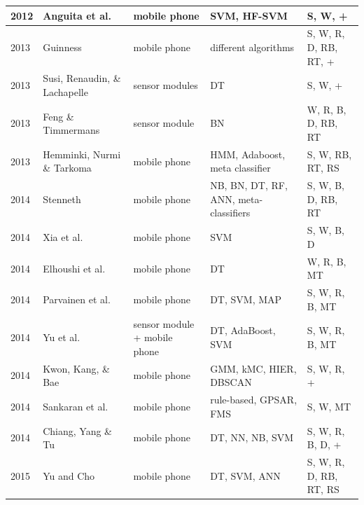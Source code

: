 \begin{center}
\begin{longtable} {|l|>{\raggedright}p{3cm}|p{2.4cm}|>{\centering\arraybackslash}p{2.5cm}|>{\centering\arraybackslash}p{2.2cm}|}
2012 & Anguita et al. \cite{anguita2012human} & mobile phone & SVM, HF-SVM & S, W, + \\ \hline
2013 & Guinness \cite{Guinness2013}& mobile phone & 20 different algorithms & S, W, R, D, RB, RT, +\\ \hline
2013 & Susi, Renaudin, \& Lachapelle \cite{susi2013motion}& sensor modules & DT & S, W, + \\ \hline
2013 & Feng \& Timmermans \cite{feng2013transportation}& sensor module  & BN & W, R, B, D, RB, RT \\ \hline
2013 & Hemminki, Nurmi \& Tarkoma \cite{hemminki2013accelerometer}& mobile phone & HMM, Adaboost, meta classifier & S, W, RB, RT, RS \\ \hline
2014 & Stenneth \cite{stenneth2014detecting} & mobile phone & NB, BN, DT, RF, ANN, meta-classifiers & S, W, B, D, RB, RT\\ \hline
2014 & Xia et al. \cite{xia2014using}& mobile phone & SVM & S, W, B, D\\ \hline
2014 & Elhoushi et al. \cite{elhoushi2014robust}& mobile phone & DT & W, R, B, MT \\ \hline
2014 & Parvainen et al. \cite{parviainen2014adaptive} & mobile phone & DT, SVM, MAP & S, W, R, B, MT \\ \hline
2014 & Yu et al. \cite{yu2014big} & sensor module + mobile phone & DT, AdaBoost, SVM & S, W, R, B, MT \\ \hline
2014 & Kwon, Kang, \& Bae \cite{kwon2014unsupervised} & mobile phone & GMM, kMC, HIER, DBSCAN & S, W, R, +\\ \hline
2014 & Sankaran et al. \cite{sankaran2014using} & mobile phone & rule-based, GPSAR, FMS & S, W, MT \\ \hline
2014 & Chiang, Yang \& Tu \cite{chiang2014pattern} & mobile phone & DT, NN, NB, SVM & S, W, R, B, D, + \\ \hline 
2015 & Yu and Cho \cite{yu2015low} & mobile phone & DT, SVM, ANN & S, W, R, D, RB, RT, RS \\ \hline
\end{longtable}
\end{center}
%
%
%
%
%
%
%
%
%
